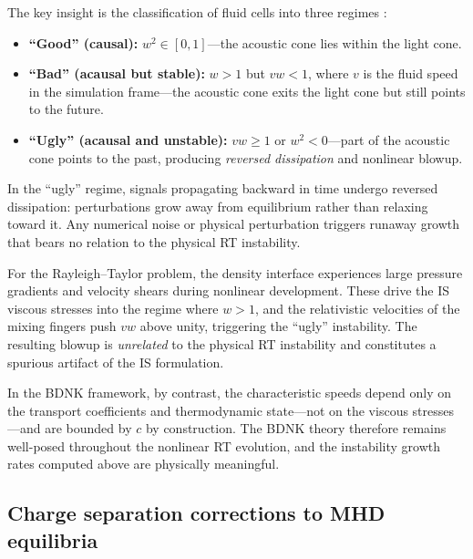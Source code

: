 The key insight is the classification of fluid cells into three regimes
\citep{GavassinoAcausalityIS2025,GavassinoCausalityHIC2025}:
\begin{itemize}
  \item \textbf{``Good'' (causal):} $w^{2} \in [0,1]$---the acoustic
    cone lies within the light cone.
  \item \textbf{``Bad'' (acausal but stable):} $w > 1$ but $vw < 1$,
    where $v$ is the fluid speed in the simulation frame---the acoustic
    cone exits the light cone but still points to the future.
  \item \textbf{``Ugly'' (acausal and unstable):} $vw \ge 1$ or
    $w^{2} < 0$---part of the acoustic cone points to the past,
    producing \emph{reversed dissipation} and nonlinear blowup.
\end{itemize}
In the ``ugly'' regime, signals propagating backward in time undergo
reversed dissipation: perturbations grow away from equilibrium rather
than relaxing toward it.  Any numerical noise or physical perturbation
triggers runaway growth that bears no relation to the physical RT
instability.

For the Rayleigh--Taylor problem, the density interface experiences
large pressure gradients and velocity shears during nonlinear
development.  These drive the IS viscous stresses into the regime
where $w > 1$, and the relativistic velocities of the mixing fingers
push $vw$ above unity, triggering the ``ugly'' instability.  The
resulting blowup is \emph{unrelated} to the physical RT instability
and constitutes a spurious artifact of the IS formulation.

In the BDNK framework, by contrast, the characteristic speeds depend
only on the transport coefficients and thermodynamic state---not on
the viscous stresses---and are bounded by $c$ by construction.  The
BDNK theory therefore remains well-posed throughout the nonlinear
RT evolution, and the instability growth rates computed above are
physically meaningful.

\subsection{Charge separation corrections to MHD equilibria}
\label{sec:rel-10-charge-separation}

